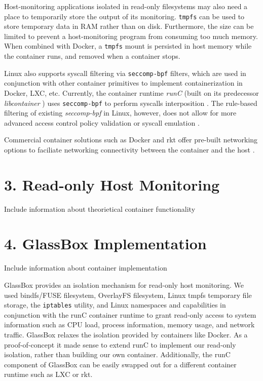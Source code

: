 \documentclass{proc}
\begin{document}
Host-monitoring applications isolated in read-only filesystems may also need a place to temporarily store the output of its monitoring. \texttt{tmpfs} can be used to store temporary data in RAM rather than on disk. Furthermore, the size can be limited to prevent a host-monitoring program from consuming too much memory. When combined with Docker, a \texttt{tmpfs} mount is persisted in host memory while the container runs, and removed when a container stops.

Linux also supports syscall filtering via \texttt{seccomp-bpf} filters, which are used in conjunction with other container primitives to implement containerization in Docker, LXC, etc. Currently, the container runtime \textit{runC} (built on its predecessor \textit{libcontainer} \cite{hykes2014libcontainer}) uses \texttt{seccomp-bpf} to perform syscalls interposition \cite{opencontainerinitiative}. The rule-based filtering of existing \textit{seccomp-bpf} in Linux, however, does not allow for more advanced access control policy validation or syscall emulation \cite{seccompuserspace}.

Commercial container solutions such as Docker and rkt offer pre-built networking options to faciliate networking connectivity between the container and the host \cite{dockernetworking, rktnetworking}.

\section*{3. Read-only Host Monitoring}

Include information about theorietical container functionality

\section*{4. GlassBox Implementation}

Include information about container implementation

GlassBox provides an isolation mechanism for read-only host monitoring. We used bindfs/FUSE filesystem, OverlayFS filesystem, Linux tmpfs temporary file storage, the \texttt{iptables} utility, and Linux namespaces and capabilities in conjunction with the runC container runtime to grant read-only access to system information such as CPU load, process information, memory usage, and network traffic. GlassBox relaxes the isolation provided by containers like Docker. As a proof-of-concept it made sense to extend runC to implement our read-only isolation, rather than building our own container. Additionally, the runC component of GlassBox can be easily swapped out for a different container runtime such as LXC or rkt. 
\end{document}
